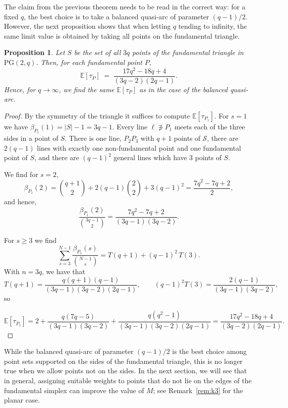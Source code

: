 \documentclass{article}
\newtheorem{proposition}{Proposition}
\newcommand{\PG}{\mathrm{PG}}
\newcommand{\E}{\mathbb{E}}
\begin{document}
The claim from the previous theorem needs to be read in the correct way: for a fixed $q$, the best choice is to take a balanced quasi-arc of parameter $(q-1)/2.$ However, the next proposition shows that when letting $q$ tending to infinity, the same limit value is obtained by taking all points on the fundamental triangle.

\begin{proposition}
Let $S$ be the set of all $3q$ points of the fundamental triangle in
$\PG(2,q)$. Then, for each fundamental point $P$,
\[
  \;\mathbb{E}[\tau_{P}]
  \;=\; \frac{17q^{2}-18q+4}{(3q-2)(2q-1)}.
  \;
\]
Hence, for $q\to \infty$, we find the same $\E[\tau_P]$ as in the case of the balanced quasi-arc.
\end{proposition}

\begin{proof}
By the symmetry of the triangle it suffices to compute $\mathbb{E}[\tau_{P_1}]$. For $s=1$ we have $\beta_{P_1}(1)=|S|-1=3q-1$.
Every line $\ell\not\ni P_1$ meets each of the three sides in a point of $S$. There is one line, $P_2P_3$ with $q+1$ points of $\mathcal{S}$, there are $2(q-1)$ lines with exactly one non-fundamental point and one fundamental point of $S$, and there are $(q-1)^2$ general lines which have $3$ points of $S$.

We find for $s=2$,
\[
  \beta_{P_1}(2)
  = \binom{q+1}{2} + 2(q-1)\binom{2}{2} + 3(q-1)^{2}
  = \frac{7q^{2}-7q+2}{2},
\]
and hence,
\[
  \frac{\beta_{P_1}(2)}{\binom{3q-1}{2}}
  = \frac{7q^{2}-7q+2}{(3q-1)(3q-2)} .
\]

For $s\ge 3$ we find
\[
  \sum_{s=3}^{N-1}\frac{\beta_{P_1}(s)}{\binom{N-1}{s}}
  = T(q+1) + (q-1)^{2}\,T(3).
\]
With $n=3q$, we have that
\[
  T(q+1)=\frac{q(q+1)(q-1)}{(3q-1)(3q-2)(2q-1)},
  \qquad
  (q-1)^{2}T(3)=\frac{2(q-1)}{(3q-1)(3q-2)},
\]
so

\[
  \mathbb{E}[\tau_{P_1}]
  = 2 + \frac{q(7q-5)}{(3q-1)(3q-2)}
      + \frac{q(q^{2}-1)}{(3q-1)(3q-2)(2q-1)} 
  = \frac{17q^{2}-18q+4}{(3q-2)(2q-1)} .
\]


\end{proof}


While the balanced quasi-arc of parameter $(q-1)/2$ is the best choice among point sets supported on the sides of the fundamental triangle, this is no longer true when we allow points not on the sides. In the next section, we will see that in general, assigning suitable weights to points that do not lie on the edges of the fundamental simplex can improve the value of $M$; see Remark~\ref{rem:k3} for the planar case.
\end{document}
